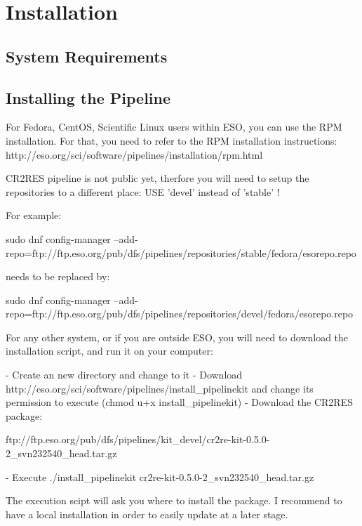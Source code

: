 \section{Installation}
\label{sec:installation}


\subsection{System Requirements}
\label{sec:platforms}

\subsection{Installing the \instrument{} Pipeline}
\label{sec:install-howto}

For Fedora, CentOS, Scientific Linux users within ESO, you can use the RPM
installation.
For that, you need to refer to the RPM installation instructions:
http://eso.org/sci/software/pipelines/installation/rpm.html

CR2RES pipeline is not public yet, therfore you will need to setup the
repositories to a different place: 
USE 'devel' instead of 'stable' ! 

For example:

sudo dnf config-manager --add-repo=ftp://ftp.eso.org/pub/dfs/pipelines/repositories/stable/fedora/esorepo.repo

needs to be replaced by:

sudo dnf config-manager --add-repo=ftp://ftp.eso.org/pub/dfs/pipelines/repositories/devel/fedora/esorepo.repo


For any other system, or if you are outside ESO, you will need to download the installation script, and run it on your computer:

- Create an new directory and change to it
- Download http://eso.org/sci/software/pipelines/install\_pipelinekit
and change its permission to execute (chmod u+x install\_pipelinekit)
- Download the CR2RES package:
  
ftp://ftp.eso.org/pub/dfs/pipelines/kit\_devel/cr2re-kit-0.5.0-2\_svn232540\_head.tar.gz

- Execute 
    ./install\_pipelinekit cr2re-kit-0.5.0-2\_svn232540\_head.tar.gz

    The execution scipt will ask you where to install the package. I recommend to have a local installation in order to easily update at a later stage.


